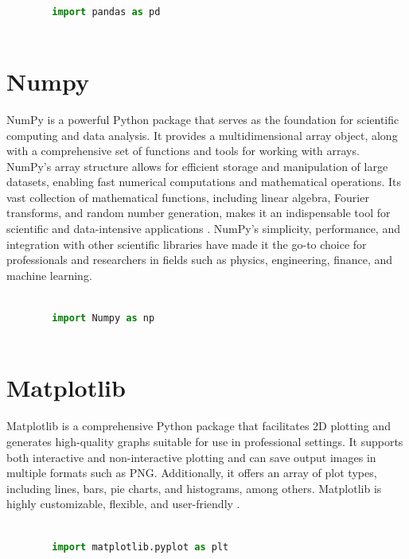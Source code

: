 	\begin{lstlisting}[language=Python]
		
		import pandas as pd
		
	\end{lstlisting}
	
	\section{Numpy}
	
	NumPy is a powerful Python package that serves as the foundation for scientific computing and data analysis. It provides a multidimensional array object, along with a comprehensive set of functions and tools for working with arrays. NumPy's array structure allows for efficient storage and manipulation of large datasets, enabling fast numerical computations and mathematical operations. Its vast collection of mathematical functions, including linear algebra, Fourier transforms, and random number generation, makes it an indispensable tool for scientific and data-intensive applications \cite{McKinney:2012}. NumPy's simplicity, performance, and integration with other scientific libraries have made it the go-to choice for professionals and researchers in fields such as physics, engineering, finance, and machine learning.
	
	\begin{lstlisting}[language=Python]
		
		import Numpy as np
		
	\end{lstlisting}
	
	\section{Matplotlib}
	
	Matplotlib is a comprehensive Python package that facilitates 2D plotting and generates high-quality graphs suitable for use in professional settings. It supports both interactive and non-interactive plotting and can save output images in multiple formats such as PNG. Additionally, it offers an array of plot types, including lines, bars, pie charts, and histograms, among others. Matplotlib is highly customizable, flexible, and user-friendly \cite{Hunter:2007}.
	
	\begin{lstlisting}[language=Python]
		
		import matplotlib.pyplot as plt
		
	\end{lstlisting}
	
